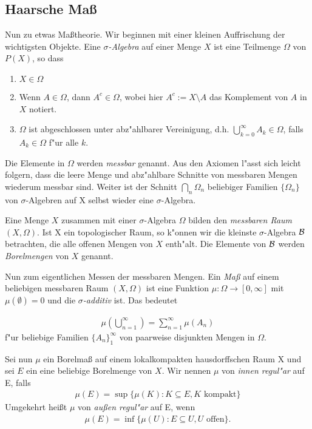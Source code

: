 \subsection{Haarsche Maß}
	Nun zu etwas Maßtheorie. Wir beginnen mit einer kleinen Auffrischung der wichtigsten Objekte. Eine \emph{$\sigma$-Algebra} auf einer Menge $X$ ist eine Teilmenge $\Omega$ von $P(X)$, so dass
	\begin{enumerate}[label=(\roman*)]
		\item $X \in \Omega$
		\item Wenn $A \in \Omega$, dann $A^c \in \Omega$, wobei hier $A^c := X\setminus A$ das Komplement von $A$ in $X$ notiert.
		\item $\Omega$ ist abgeschlossen unter abz"ahlbarer Vereinigung, d.h. $\bigcup_{k=0}^{\infty} A_k \in \Omega$, falls $A_k \in \Omega$ f"ur alle $k$.
	\end{enumerate}
	Die Elemente in $\Omega$ werden \emph{messbar} genannt. Aus den Axiomen l"asst sich leicht folgern, dass die leere Menge und abz"ahlbare Schnitte von messbaren Mengen wiederum messbar sind. Weiter ist der Schnitt $\bigcap_n \Omega_n$ beliebiger Familien $\{\Omega_n\}$ von $\sigma$-Algebren auf X selbst wieder eine $\sigma$-Algebra.
	
	
	Eine Menge $X$ zusammen mit einer $\sigma$-Algebra $\Omega$ bilden den \emph{messbaren Raum} $(X, \Omega)$. Ist X ein topologischer Raum, so k"onnen wir die kleinste $\sigma$-Algebra $\mathcal{B}$ betrachten, die alle offenen Mengen von $X$ enth"alt. Die Elemente von $\mathcal{B}$ werden \emph{Borelmengen} von $X$ genannt.
	
	
	Nun zum eigentlichen Messen der messbaren Mengen. Ein \emph{Maß} auf einem beliebigen messbaren Raum $(X, \Omega)$ ist eine Funktion $\mu: \Omega \to [0, \infty]$ mit $\mu(\emptyset) = 0$ und die \emph{$\sigma$-additiv} ist. Das bedeutet
	
	\begin{align*}
		\mu( \bigcup_{n=1}^{\infty}) = \sum_{n=1}^{\infty} \mu (A_n)
	\end{align*}
	f"ur beliebige Familien $\{A_n\}_1^\infty$ von paarweise disjunkten Mengen in $\Omega$.
	
	
	Sei nun $\mu$ ein Borelmaß auf einem lokalkompakten hausdorffschen Raum X und sei $E$ ein eine beliebige Borelmenge von $X$.
	Wir nennen $\mu$ von \emph{innen regul"ar} auf E, falls
	\begin{align*}
		\mu(E) = \sup\{\mu(K): K \subseteq E, K \text{ kompakt}\}
	\end{align*}
	Umgekehrt heißt $\mu$ von \emph{außen regul"ar} auf E, wenn
	\begin{align*}
		\mu(E) = \inf\{\mu(U): E \subseteq U, U \text{ offen}\}.
	\end{align*}
	
